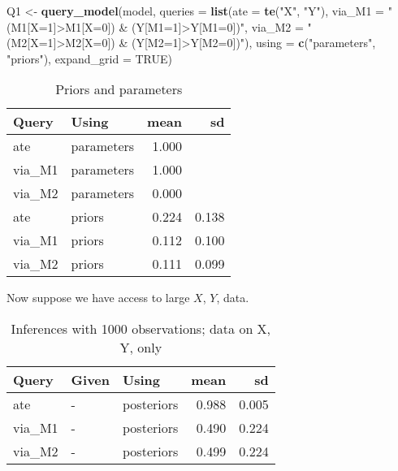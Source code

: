 \documentclass[
  12pt,
]{book}
\newenvironment{Shaded}{\begin{snugshade}}{\end{snugshade}}
\newcommand{\DataTypeTok}[1]{\textcolor[rgb]{0.13,0.29,0.53}{#1}}
\newcommand{\KeywordTok}[1]{\textcolor[rgb]{0.13,0.29,0.53}{\textbf{#1}}}
\newcommand{\NormalTok}[1]{#1}
\newcommand{\OtherTok}[1]{\textcolor[rgb]{0.56,0.35,0.01}{#1}}
\newcommand{\StringTok}[1]{\textcolor[rgb]{0.31,0.60,0.02}{#1}}
\begin{document}
\begin{Shaded}
\begin{Highlighting}[]
\NormalTok{Q1 <-}\StringTok{ }\KeywordTok{query_model}\NormalTok{(model, }
  \DataTypeTok{queries =} \KeywordTok{list}\NormalTok{(}\DataTypeTok{ate =} \KeywordTok{te}\NormalTok{(}\StringTok{"X"}\NormalTok{, }\StringTok{"Y"}\NormalTok{), }
                 \DataTypeTok{via_M1 =} \StringTok{"(M1[X=1]>M1[X=0]) & (Y[M1=1]>Y[M1=0])"}\NormalTok{, }
                 \DataTypeTok{via_M2 =} \StringTok{"(M2[X=1]>M2[X=0]) & (Y[M2=1]>Y[M2=0])"}\NormalTok{), }
  \DataTypeTok{using =} \KeywordTok{c}\NormalTok{(}\StringTok{"parameters"}\NormalTok{, }\StringTok{"priors"}\NormalTok{),}
  \DataTypeTok{expand_grid =} \OtherTok{TRUE}\NormalTok{) }
\end{Highlighting}
\end{Shaded}

\begin{table}

\caption{\label{tab:apppaths3}Priors and parameters}
\centering
\begin{tabular}[t]{l|l|r|r}
\hline
Query & Using & mean & sd\\
\hline
ate & parameters & 1.000 & \\
\hline
via\_M1 & parameters & 1.000 & \\
\hline
via\_M2 & parameters & 0.000 & \\
\hline
ate & priors & 0.224 & 0.138\\
\hline
via\_M1 & priors & 0.112 & 0.100\\
\hline
via\_M2 & priors & 0.111 & 0.099\\
\hline
\end{tabular}
\end{table}

Now suppose we have access to large \(X\), \(Y\), data.

\begin{table}

\caption{\label{tab:apppath4}Inferences with 1000 observations; data on X, Y, only}
\centering
\begin{tabular}[t]{l|l|l|r|r}
\hline
Query & Given & Using & mean & sd\\
\hline
ate & - & posteriors & 0.988 & 0.005\\
\hline
via\_M1 & - & posteriors & 0.490 & 0.224\\
\hline
via\_M2 & - & posteriors & 0.499 & 0.224\\
\hline
\end{tabular}
\end{table}
\end{document}
